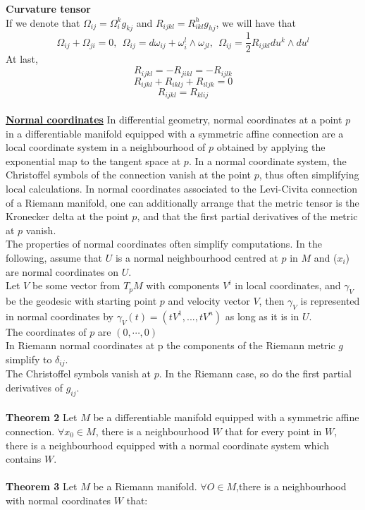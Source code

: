 \documentclass{article}
\begin{document}
\textbf{Curvature tensor}\\
If we denote that $\Omega_{ij} = \Omega_{i}^{k}g_{kj}$ and $R_{ijkl} = R^{h}_{ikl}g_{hj}$, we will have that
\[\Omega_{ij} + \Omega_{ji} = 0,\ \ \Omega_{ij} = d\omega_{ij} + \omega_{i}^{l} \wedge \omega_{jl},\ \ \Omega_{ij} = \frac{1}{2}R_{ijkl}du^k \wedge du^l\]
At last,
\[R_{ijkl} = -R_{jikl} = -R_{ijlk}\]
\[R_{ijkl}+R_{iklj}+R_{iljk}=0\]
\[R_{ijkl} = R_{klij}\]\\
\href{https://en.wikipedia.org/wiki/Normal_coordinates}{\textbf{Normal coordinates}}  In differential geometry, normal coordinates at a point $p$ in a differentiable manifold equipped with a symmetric affine connection are a local coordinate system in a neighbourhood of $p$ obtained by applying the exponential map to the tangent space at $p$. In a normal coordinate system, the Christoffel symbols of the connection vanish at the point $p$, thus often simplifying local calculations. In normal coordinates associated to the Levi-Civita connection of a Riemann manifold, one can additionally arrange that the metric tensor is the Kronecker delta at the point $p$, and that the first partial derivatives of the metric at $p$ vanish.\\
The properties of normal coordinates often simplify computations. In the following, assume that $U$ is a normal neighbourhood centred at $p$ in $M$ and ($x_i$) are normal coordinates on $U$.\\
Let $V$ be some vector from $T_pM$ with components $V^i$ in local coordinates, and $\gamma_V$ be the geodesic with starting point $p$ and velocity vector $V$, then $\gamma_V$ is represented in normal coordinates by $\gamma _{V}(t)=(tV^{1},...,tV^{n})$ as long as it is in $U$.\\
    The coordinates of $p$ are $(0, \cdots, 0)$\\
    In Riemann normal coordinates at p the components of the Riemann metric $g$ simplify to $\delta _{ij}$.\\
    The Christoffel symbols vanish at $p$. In the Riemann case, so do the first partial derivatives of $g_{ij}$.\\ \\
\textbf{Theorem 2} Let $M$ be a differentiable manifold equipped with a symmetric affine connection. $\forall x_0 \in M$, there is a neighbourhood $W$ that for every point in $W$, there is a neighbourhood equipped with a normal coordinate system which contains $W$. \\ \\
\textbf{Theorem 3} Let $M$ be a Riemann manifold. $\forall O \in M$,there is a neighbourhood with normal coordinates $W$ that:\\
\end{document}
